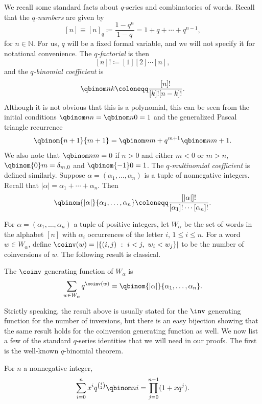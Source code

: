 We recall some standard facts about $q$-series and combinatorics of words. 
Recall that the {\em $q$-numbers} are given by 
\[
[n] \equiv [n]_q \coloneqq \frac{1-q^n}{1-q} = 1 + q + \cdots + q^{n-1}, 
\]
for $n \in \mathbb{N}$. For us, $q$ will be a fixed formal variable,
and we will not specify it for notational convenience.
The {\em $q$-factorial} is then
\[
[n]! \coloneqq [1] [2] \cdots [n],
\]
and the {\em $q$-binomial coefficient} is
\[
\qbinom nk \coloneqq \frac{[n]!}{[k]! [n-k]!}.
\]
Although it is not obvious that this is a polynomial, this can be seen
from the initial conditions $\qbinom nn = \qbinom n0 = 1$
and the generalized Pascal triangle recurrence
\begin{equation}
\label{qbinom-recur}
\qbinom {n+1}{m+1} = \qbinom nm + q^{m+1} \qbinom n{m+1}.
\end{equation}
We also note that $\qbinom nm = 0$ if $n > 0$ and either $m < 0$ or $m > n$, $\qbinom {0}m = \delta_{m,0}$ and $\qbinom {-1}0 = 1$.
The  {\em $q$-multinomial coefficient} is defined similarly. Suppose 
$\alpha = (\alpha_1,\dots, \allowbreak \alpha_n)$ is a tuple of nonnegative integers.
Recall that $|\alpha| = \alpha_1 + \cdots + \alpha_n$. Then
\[
\qbinom{|\alpha|}{\alpha_1,\dots,\alpha_n} \coloneqq \frac{[|\alpha|]!}{[\alpha_1]! \cdots [\alpha_n]!}.
\]


For $\alpha = (\alpha_1,\dots, \alpha_n)$ a tuple of positive integers, let $W_\alpha$
be the set of words in the alphabet $[n]$ with $\alpha_i$ occurrences of the letter $i$,
$1 \leq i \leq n$. For a word $w\in W_{\alpha}$, define $\coinv(w) = |\{(i,j)\ :\ i<j,\ w_i<w_j\}|$ to be the number of coinversions of $w$. The following result is classical.

\begin{proposition}
\label{prop:coinv-gf}
The $\coinv$ generating function of $W_\alpha$ is
\[
\sum_{w \in W_\alpha} q^{\coinv(w)} = \qbinom{|\alpha|}{\alpha_1,\dots,\alpha_n}.
\]
\end{proposition}

Strictly speaking, the result above is usually stated for the $\inv$ generating function for the number of inversions, but there is an easy bijection showing that the same result holds for the coinversion generating function as well.
We now list a few of the standard $q$-series identities that we will need in our proofs. The first is the 
well-known $q$-binomial theorem.

\begin{proposition}
\label{prop:qbinom}
For $n$ a nonnegative integer,
\[
\sum_{i=0}^n x^i q^{\binom{i}{2}} \qbinom ni = \prod_{j=0}^{n-1} (1 + x q^j).
\]
\end{proposition}

